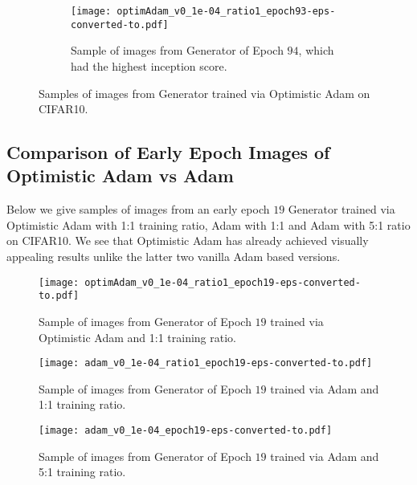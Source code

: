 \begin{figure}[H]
    \centering  
    \begin{subfigure}[b]{1\textwidth}
        \centering
    		\texttt{[image: optimAdam\_v0\_1e-04\_ratio1\_epoch93-eps-converted-to.pdf]}
    	\caption{Sample of images from Generator of Epoch $94$, which had the highest inception score.}
    \end{subfigure}
    \caption{Samples of images from Generator trained via Optimistic Adam on CIFAR10.}\label{fig:optimistic-Adam}
\end{figure}

\subsection{Comparison of Early Epoch Images of Optimistic Adam vs Adam}
Below we give samples of images from an early epoch $19$ Generator trained via Optimistic Adam with 1:1 training ratio, Adam with 1:1 and Adam with 5:1 ratio on CIFAR10. We see that Optimistic Adam has already achieved visually appealing results unlike the latter two vanilla Adam based versions.

\begin{figure}[H]
        \centering
    		\texttt{[image: optimAdam\_v0\_1e-04\_ratio1\_epoch19-eps-converted-to.pdf]}
    	\caption{Sample of images from Generator of Epoch $19$ trained via Optimistic Adam and 1:1 training ratio.}
\end{figure}
\begin{figure}[H]
        \centering
    		\texttt{[image: adam\_v0\_1e-04\_ratio1\_epoch19-eps-converted-to.pdf]}
    	\caption{Sample of images from Generator of Epoch $19$ trained via  Adam and 1:1 training ratio.}
\end{figure} 
\begin{figure}[H]
        \centering
    		\texttt{[image: adam\_v0\_1e-04\_epoch19-eps-converted-to.pdf]}
    	\caption{Sample of images from Generator of Epoch $19$ trained via  Adam and 5:1 training ratio.}
\end{figure}
    